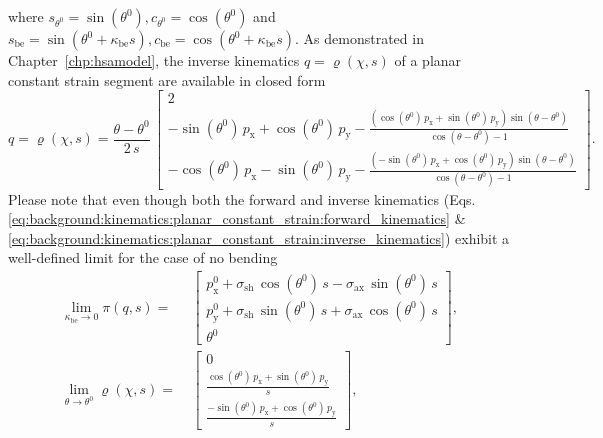 where $s_{\theta^0} = \sin(\theta^0), c_{\theta^0} = \cos(\theta^0)$ and $s_\mathrm{be} = \sin(\theta^0+\kappa_\mathrm{be} s), c_\mathrm{be} = \cos(\theta^0+\kappa_\mathrm{be} s)$.
As demonstrated in Chapter~\ref{chp:hsamodel}, the inverse kinematics $q = \varrho(\chi,s)$ of a planar constant strain segment are available in closed form
\begin{equation}\label{eq:background:kinematics:planar_constant_strain:inverse_kinematics}
    q = \varrho(\chi,s) = \frac{\theta-\theta^0}{2 \, s} \, \begin{bmatrix}
        2\\
        -\sin(\theta^0) \, p_\mathrm{x} + \cos(\theta^0) \, p_\mathrm{y} - \frac{\left (\cos(\theta^0) \, p_\mathrm{x} + \sin(\theta^0) \,  p_\mathrm{y} \right ) \sin(\theta-\theta^0)}{\cos(\theta-\theta^0)-1}\\
        -\cos(\theta^0) \, p_\mathrm{x} - \sin(\theta^0) \, p_\mathrm{y} - \frac{\left (-\sin(\theta^0) \, p_\mathrm{x} + \cos(\theta^0) \,  p_\mathrm{y} \right ) \sin(\theta-\theta^0)}{\cos(\theta-\theta^0)-1}
    \end{bmatrix}.
\end{equation}
Please note that even though both the forward and inverse kinematics (Eqs. \eqref{eq:background:kinematics:planar_constant_strain:forward_kinematics} \& \eqref{eq:background:kinematics:planar_constant_strain:inverse_kinematics}) exhibit a well-defined limit for the case of no bending
\begin{equation}
\begin{split}
    \lim_{\kappa_\mathrm{be} \to 0} \pi(q,s) =& \: \begin{bmatrix}
        p_\mathrm{x}^0 + \sigma_\mathrm{sh} \, \cos(\theta^0) \, s - \sigma_\mathrm{ax} \, \sin(\theta^0) \, s\\
        p_\mathrm{y}^0 + \sigma_\mathrm{sh} \, \sin(\theta^0) \, s + \sigma_\mathrm{ax} \, \cos(\theta^0) \, s\\
        \theta^0
    \end{bmatrix}, \\
    \lim_{\theta \to \theta^0} \varrho(\chi,s) =& \: \begin{bmatrix}
        0\\
        \frac{\cos(\theta^0) \, p_\mathrm{x} + \sin(\theta^0) \,  p_\mathrm{y}}{s}\\
        \frac{-\sin(\theta^0) \, p_\mathrm{x} + \cos(\theta^0) \,  p_\mathrm{y}}{s}
    \end{bmatrix},\\
\end{split}
\end{equation}
